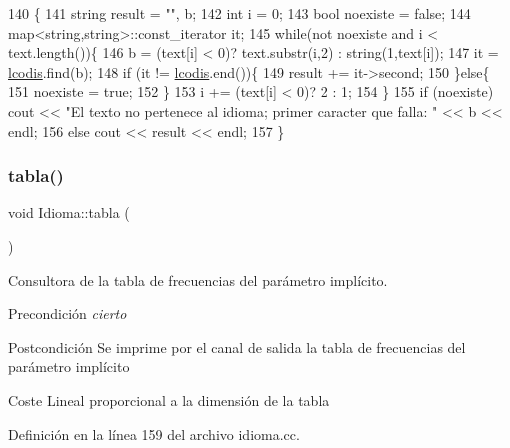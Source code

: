 \begin{DoxyCode}
140                                               \{
141   \textcolor{keywordtype}{string} result = \textcolor{stringliteral}{""}, b;
142   \textcolor{keywordtype}{int} i = 0;
143   \textcolor{keywordtype}{bool} noexiste = \textcolor{keyword}{false};
144   map<string,string>::const\_iterator it;
145   \textcolor{keywordflow}{while}(not noexiste and i < text.length())\{
146     b = (text[i] < 0)? text.substr(i,2) : string(1,text[i]);
147     it = \hyperlink{class_idioma_ab908f7375f4506b26dd3cd163bc0b8cd}{lcodis}.find(b);
148     \textcolor{keywordflow}{if} (it != \hyperlink{class_idioma_ab908f7375f4506b26dd3cd163bc0b8cd}{lcodis}.end())\{
149       result += it->second;
150     \}\textcolor{keywordflow}{else}\{
151       noexiste = \textcolor{keyword}{true};
152     \}
153     i += (text[i] < 0)? 2 : 1;
154   \}
155   \textcolor{keywordflow}{if} (noexiste) cout << \textcolor{stringliteral}{"El texto no pertenece al idioma; primer caracter que falla: "} << b << endl;
156   \textcolor{keywordflow}{else} cout << result << endl;
157 \}
\end{DoxyCode}
\mbox{\label{class_idioma_a862b9fe26b8929a7d6b4af8a1373d0a0}} 
\subsubsection{\texorpdfstring{tabla()}{tabla()}}
{\footnotesize\ttfamily void Idioma\+::tabla (\begin{DoxyParamCaption}{ }\end{DoxyParamCaption})}



Consultora de la tabla de frecuencias del parámetro implícito. 

\begin{DoxyPrecond}{Precondición}
{\itshape cierto} 
\end{DoxyPrecond}
\begin{DoxyPostcond}{Postcondición}
Se imprime por el canal de salida la tabla de frecuencias del parámetro implícito 
\end{DoxyPostcond}
\begin{DoxyParagraph}{Coste}
Lineal proporcional a la dimensión de la tabla 
\end{DoxyParagraph}


Definición en la línea 159 del archivo idioma.\+cc.


